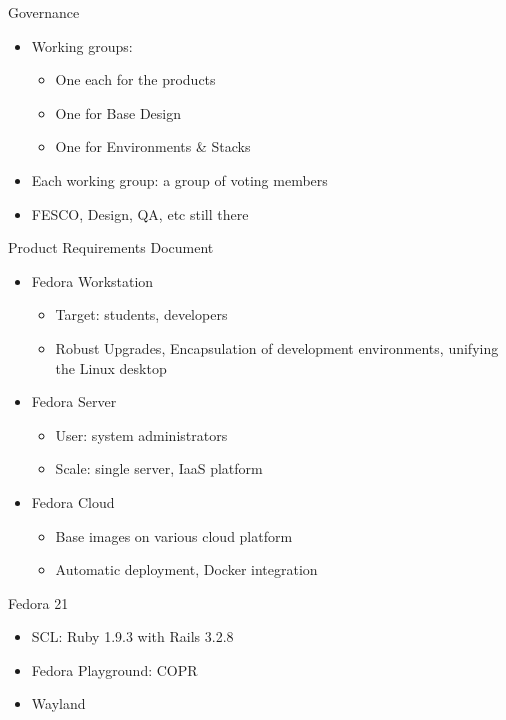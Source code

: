 \documentclass{beamer}
\begin{document}
\begin{frame}{Governance}
  \begin{itemize}
    \item Working groups:
      \begin{itemize}
        \item One each for the products
        \item One for Base Design
        \item One for Environments \& Stacks
      \end{itemize}
    \item Each working group: a group of voting members
    \item FESCO, Design, QA, etc still there
  \end{itemize}
\end{frame}

\begin{frame}{Product Requirements Document}
  \begin{itemize}
    \item Fedora Workstation
      \begin{itemize}
        \item Target: students, developers
        \item Robust Upgrades, Encapsulation of development
          environments, unifying the Linux desktop
      \end{itemize}
    \item Fedora Server
      \begin{itemize}
        \item User: system administrators
        \item Scale: single server, IaaS platform
      \end{itemize}
    \item Fedora Cloud
      \begin{itemize}
        \item Base images on various cloud platform
        \item Automatic deployment, Docker integration
      \end{itemize}
  \end{itemize}
\end{frame}

\begin{frame}{Fedora 21}
  \begin{itemize}
    \item SCL: Ruby 1.9.3 with Rails 3.2.8
    \item Fedora Playground: COPR
    \item Wayland
  \end{itemize}
\end{frame}
\end{document}
